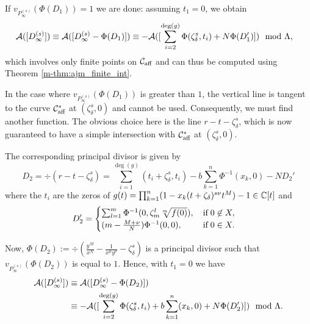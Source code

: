 \documentclass[main.tex]{subfiles}
\begin{document}
  
    If $v_{P_{\infty}^{(s)}}(\Phi(D_1)) = 1$ we are done: assuming $t_1 = 0$, we obtain
    \begin{align}
      \mathcal{A}( [D_{\infty}^{(s)}] )  & \equiv  \mathcal{A}([D_{\infty}^{(s)} - \Phi(D_1)])  
      \equiv  -\mathcal{A}( [\sum_{i = 2}^{\operatorname{deg}(g)} \Phi(\zeta_{\delta}^s,t_i) + N \Phi(D_1') ] )
       \mod \Lambda,
    \end{align}
    which involves only finite points on $\mathcal{C}_{\text{aff}}$ and can thus be computed using Theorem \ref{m-thm:ajm_finite_int}.
    
    \bigskip
    
    In the case where $v_{P_{\infty}^{(s)}}(\Phi(D_1))$ is greater than $1$, the vertical line is tangent to the curve $\mathcal{C}_{\text{aff}}^{*}$ 
    at $(\zeta_{\delta}^s,0)$ and cannot be used.
    Consequently, we must find another function. The obvious choice here is the line $r - t -  \zeta_{\delta}^s$, which
    is now guaranteed to have a simple intersection with $\mathcal{C}_{\text{aff}}^{*}$ 
    at $(\zeta_{\delta}^s,0)$.

    The corresponding principal divisor is given by
     \begin{equation}
      D_2 = \div(r - t - \zeta_{\delta}^s) = \sum_{i = 1}^{\deg(g)} (t_i+\zeta_{\delta}^s,t_i) - b \sum_{k=1}^n
      \Phi^{-1}(x_k,0)- N D_2'
   \end{equation}
      where the $t_i$ are the zeros of $g(t) = \prod_{k=1}^n (1-x_k(t+\zeta_{\delta})^{s\nu}t^M) - 1 \in \mathbb{C}[t]$ and
    \begin{equation}
       D_2' = \begin{cases}
             \sum_{l=1}^m \Phi^{-1}(0,\zeta_m^l \sqrt[m]{f(0)}), \quad \text{if} \; 0 \not\in X,\\
             (m-\frac{M+\nu}{N}) \Phi^{-1}(0,0), \hfill \text{if} \; 0 \in X.
            \end{cases}
    \end{equation}
 
    Now, $\Phi(D_2) := \div \left( \frac{y^M}{x^N} - \frac{1}{x^{\mu}y^{\nu}} - \zeta_{\delta}^s \right)$
    is a principal divisor such that
    $v_{P_{\infty}^{(s)}}(\Phi(D_2))$ is equal to $1$. Hence, with $t_1 = 0$ we have
     \begin{align}
      \mathcal{A}( [D_{\infty}^{(s)}] )  & \equiv  \mathcal{A}([D_{\infty}^{(s)} - \Phi(D_2)])  \\
      & \equiv  -\mathcal{A}( [\sum_{i = 2}^{\operatorname{deg}(g)} \Phi(\zeta_{\delta}^s,t_i) + b \sum_{k=1}^n
      (x_k,0) + N \Phi(D_2') ] )
       \mod \Lambda.
    \end{align}
    
\end{document}
